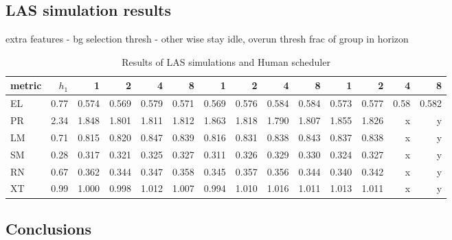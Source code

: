\subsection{LAS simulation results}
extra features - bg selection thresh - other wise stay idle, overun thresh frac of group in horizon
\begin{table}
\begin{center}
\begin{tabular}{|l|r|rrrr|rrrr|rrrr|}
\hline
{\bf metric} & {\bf $h_1$} & {\bf 1} & {\bf 2} &  {\bf 4} & {\bf 8} & {\bf 1} & {\bf 2} &  {\bf 4} & {\bf 8}   & {\bf 1} & {\bf 2} &  {\bf 4} & {\bf 8} \\
\hline
EL & 0.77 & 0.574 &0.569 &0.579 &0.571 &0.569 &0.576 &0.584 &0.584 &0.573 &0.577 & 0.58 & 0.582\\
\hline
PR & 2.34 & 1.848 &1.801 &1.811 &1.812 &1.863 &1.818 &1.790 &1.807 &1.855 &1.826 & x&y\\
\hline
LM & 0.71 & 0.815 &0.820 &0.847 &0.839 &0.816 &0.831 &0.838 &0.843 &0.837 &0.838 & x&y\\
\hline
SM & 0.28 & 0.317 &0.321 &0.325 &0.327 &0.311 &0.326 &0.329 &0.330 &0.324 &0.327 & x&y\\
\hline
RN & 0.67 & 0.362 &0.344 &0.347 &0.358 &0.345 &0.357 &0.356 &0.344 &0.340 &0.342 & x&y\\
\hline
XT & 0.99 & 1.000 &0.998 &1.012 &1.007 &0.994 &1.010 &1.016 &1.011 &1.013 &1.011 & x&y\\
\hline
\end{tabular}
\label{tab:lascomp}
\caption{Results of LAS simulations and Human scheduler}
\end{center}
\end{table}

\subsection{Conclusions}

